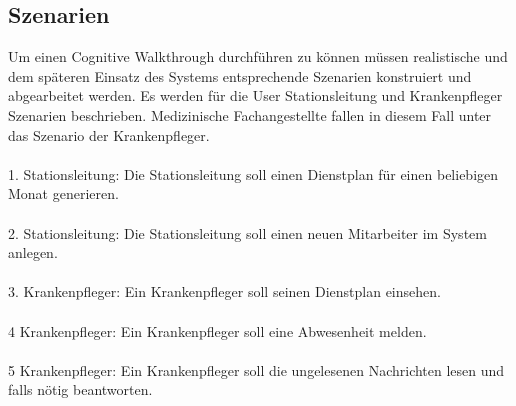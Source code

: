 \documentclass[11pt,
paper=a4,
bibtotocnumbered,	  %
liststotocnumbered,  %
DIV=calc,		  %
tablecaptionabove,	  %
headinclude,
]{article}
\begin{document}
\subsection{Szenarien}
Um einen Cognitive Walkthrough durchführen zu können müssen realistische und dem späteren Einsatz des Systems entsprechende Szenarien konstruiert und abgearbeitet werden. Es werden für die User Stationsleitung und Krankenpfleger Szenarien beschrieben. Medizinische Fachangestellte fallen in diesem Fall unter das Szenario der Krankenpfleger.\\\\

1. Stationsleitung: Die Stationsleitung soll einen Dienstplan für einen beliebigen Monat generieren.\\\\
2. Stationsleitung: Die Stationsleitung soll einen neuen Mitarbeiter im System anlegen.\\\\
3. Krankenpfleger: Ein Krankenpfleger soll seinen Dienstplan einsehen. \\\\
4 Krankenpfleger: Ein Krankenpfleger soll eine Abwesenheit melden. \\\\
5 Krankenpfleger: Ein Krankenpfleger soll die ungelesenen Nachrichten lesen und falls nötig beantworten.\\\\
\end{document}

